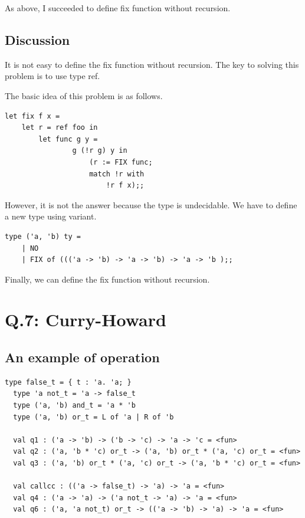 \documentclass[uplatex,12pt]{jsarticle}
\begin{document}
As above, I succeeded to define fix function without recursion.

\vspace{12pt}
\subsection{Discussion}
It is not easy to define the fix function without recursion. The key to solving this problem is to use type ref.

The basic idea of this problem is as follows.
\begin{lstlisting}[caption=basic idea]
let fix f x =
    let r = ref foo in
        let func g y =
                g (!r g) y in
                    (r := FIX func;
                    match !r with
                        !r f x);;
\end{lstlisting}

However, it is not the answer because the type is undecidable. We have to define a new type using variant.
\begin{lstlisting}[caption=type define]
type ('a, 'b) ty =
    | NO
    | FIX of ((('a -> 'b) -> 'a -> 'b) -> 'a -> 'b );;
\end{lstlisting}

Finally, we can define the fix function without recursion.


\section{Q.7: Curry-Howard}
\subsection{An example of operation}

\begin{lstlisting}[caption=output]
  type false_t = { t : 'a. 'a; }
  type 'a not_t = 'a -> false_t
  type ('a, 'b) and_t = 'a * 'b
  type ('a, 'b) or_t = L of 'a | R of 'b

  val q1 : ('a -> 'b) -> ('b -> 'c) -> 'a -> 'c = <fun>
  val q2 : ('a, 'b * 'c) or_t -> ('a, 'b) or_t * ('a, 'c) or_t = <fun>
  val q3 : ('a, 'b) or_t * ('a, 'c) or_t -> ('a, 'b * 'c) or_t = <fun>

  val callcc : (('a -> false_t) -> 'a) -> 'a = <fun>
  val q4 : ('a -> 'a) -> ('a not_t -> 'a) -> 'a = <fun>
  val q6 : ('a, 'a not_t) or_t -> (('a -> 'b) -> 'a) -> 'a = <fun>

\end{lstlisting}
\end{document}
